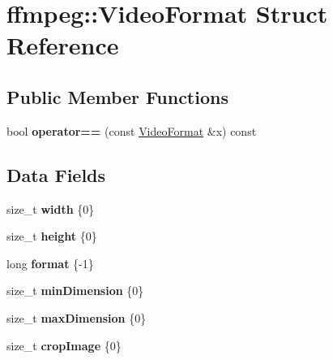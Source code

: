 \hypertarget{structffmpeg_1_1VideoFormat}{}\section{ffmpeg\+:\+:Video\+Format Struct Reference}
\label{structffmpeg_1_1VideoFormat}
\subsection*{Public Member Functions}
\begin{DoxyCompactItemize}
\item 
\mbox{\label{structffmpeg_1_1VideoFormat_a9674a139b2379de993eb9c842de2b4f4}} 
bool {\bfseries operator==} (const \hyperlink{structffmpeg_1_1VideoFormat}{Video\+Format} \&x) const
\end{DoxyCompactItemize}
\subsection*{Data Fields}
\begin{DoxyCompactItemize}
\item 
\mbox{\label{structffmpeg_1_1VideoFormat_a5f5d919c1d8901a9b1c41cfc8027d27d}} 
size\+\_\+t {\bfseries width} \{0\}
\item 
\mbox{\label{structffmpeg_1_1VideoFormat_afb4ca4c40ccb5f48eee79b23f0d1b60f}} 
size\+\_\+t {\bfseries height} \{0\}
\item 
\mbox{\label{structffmpeg_1_1VideoFormat_a8a006ef2fe0d38f69cbea4da7f2b4bab}} 
long {\bfseries format} \{-\/1\}
\item 
\mbox{\label{structffmpeg_1_1VideoFormat_a3c89d9089e901369e1ba478d4f8831e3}} 
size\+\_\+t {\bfseries min\+Dimension} \{0\}
\item 
\mbox{\label{structffmpeg_1_1VideoFormat_a73e33ff57e6337c6b63c64d05d5065d7}} 
size\+\_\+t {\bfseries max\+Dimension} \{0\}
\item 
\mbox{\label{structffmpeg_1_1VideoFormat_af5e932433d2b4173a15d63dad99256c6}} 
size\+\_\+t {\bfseries crop\+Image} \{0\}
\end{DoxyCompactItemize}


